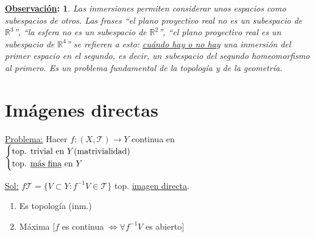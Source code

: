 \documentclass[10pt,a4paper,openright]{book}
\theoremstyle{break}
\newtheorem*{obs}{\underline{Observación}:}
\begin{document}
\begin{obs}
Las inmersiones permiten considerar unos espacios como subespacios de otros. Las frases ``el plano proyectivo real no es un subespacio de $\mathbb{R}^3$'', ``la esfera no es un subespacio de $\mathbb{R}^2$'', ``el plano proyectivo real es un subespacio de $\mathbb{R}^4$'' se refieren a esto: \underline{cuándo hay o no hay} una inmersión del primer espacio en el segundo, es decir, un subespacio del segundo homeomorfismo al primero. Es un problema fundamental de la topología
y de la geometría.
\end{obs}

\section{Imágenes directas}%
\label{sec:imagenes_directas}
\underline{Problema:} Hacer $f: \left( X, \mathcal{T} \right) \rightarrow Y$ continua en $\begin{cases}
    \text{top. trivial en } Y \text{(matrivialidad)}\\
    \text{top. \underline{más fina} en } Y 
\end{cases} $ 

\underline{Sol:} $f\mathcal{T} = \{V \subset Y: f^{-1}V \in \mathcal{T}\}$ top. \underline{imagen directa}.
\begin{enumerate}
    \item Es topología (inm.)
    \item Máxima [$f$ es continua $\Leftrightarrow \forall f^{-1} V$ es abierto] 
\end{enumerate}
\end{document}
